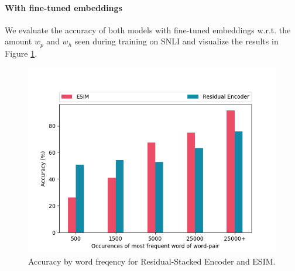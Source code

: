 \paragraph*{With fine-tuned embeddings}
We evaluate the accuracy of both models with fine-tuned embeddings w.r.t. the amount $w_p$ and $w_h$ seen during training on \ac{SNLI} and visualize the results in Figure \ref{fig:esim_res_acc_by_freq}.
\begin{figure}[tph!]
\centering
	\includegraphics[totalheight=6cm]{fig/esim_res_acc_by_freq.png}
	\caption{Accuracy by word freqency for Residual-Stacked Encoder and ESIM.}
	\label{fig:esim_res_acc_by_freq}
\end{figure}
